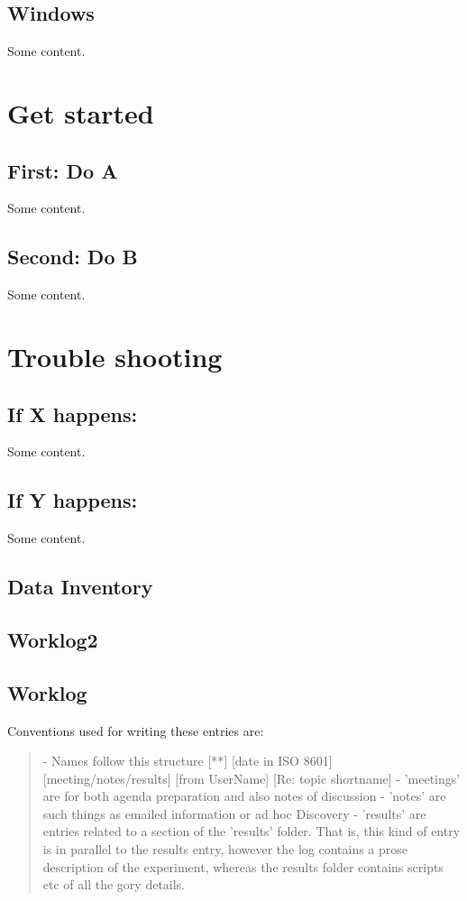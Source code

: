 \documentclass{article}
\begin{document}
\subsection*{Windows}\label{win}
Some content.
\clearpage
\section*{Get started}\label{start}
\subsection*{First: Do A}\label{caseA}
Some content.

\subsection*{Second: Do B}\label{caseB}
 Some content.
\clearpage
\section*{Trouble shooting}\label{trbl-shoot}
\subsection*{If X happens:}\label{caseX}
Some content.

\subsection*{If Y happens:}\label{caseY}
 Some content.

\subsection*{Data Inventory}\label{datinv}
\subsection*{Worklog2}\label{mac2}
\subsection*{Worklog}\label{mac3}

Conventions used for writing these entries are:
\begin{quote}
- Names follow this structure [**] [date in ISO 8601] [meeting/notes/results] [from UserName] [Re: topic shortname]
- 'meetings' are for both agenda preparation and also notes of discussion
- 'notes' are such things as emailed information or ad hoc Discovery
- 'results' are entries related to a section of the 'results' folder. 
  That is, this kind of entry is in parallel to the results entry,
  however the log contains a prose description of the experiment,
  whereas the results folder contains scripts etc of all the gory
  details.  
\end{quote}
\end{document}
